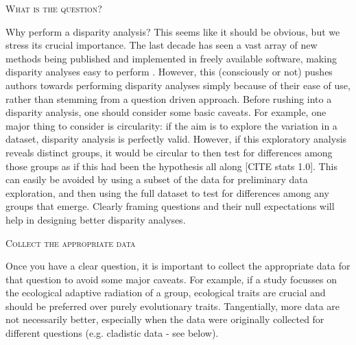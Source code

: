 \documentclass[12pt,letterpaper]{article}
\renewcommand{\section}[1]{%
\bigskip
\begin{center}
\begin{Large}
\normalfont\scshape #1
\medskip
\end{Large}
\end{center}}
\begin{document}
\section{What is the question?}
Why perform a disparity analysis?
This seems like it should be obvious, but we stress its crucial importance.
The last decade has seen a vast array of new methods being published and implemented in freely available software, making disparity analyses easy to perform \citep{bouxin2005ginkgo,oksanen2007vegan,geiger2008,zelditch2012geometric,adams2013geomorph,Claddis,dispRityv02,adams2017geometric}.
However, this (consciously or not) pushes authors towards performing disparity analyses simply because of their ease of use, rather than stemming from a question driven approach.
Before rushing into a disparity analysis, one should consider some basic caveats.
For example, one major thing to consider is circularity: if the aim is to explore the variation in a dataset, disparity analysis is perfectly valid.
However, if this exploratory analysis reveals distinct groups, it would be circular to then test for differences among those groups as if this had been the hypothesis all along [CITE stats 1.0].
This can easily be avoided by using a subset of the data for preliminary data exploration, and then using the full dataset to test for differences among any groups that emerge.
Clearly framing questions and their null expectations will help in designing better disparity analyses.

\section{Collect the appropriate data}
Once you 
have a clear question, it is important to collect the appropriate data for that question to avoid some major caveats.
For example, if a study focusses on the ecological adaptive radiation of a group, ecological traits are crucial and should be preferred over purely evolutionary traits.
Tangentially, more data are not necessarily better, especially when the data were originally collected for different questions (e.g. cladistic data - see below).
\end{document}
